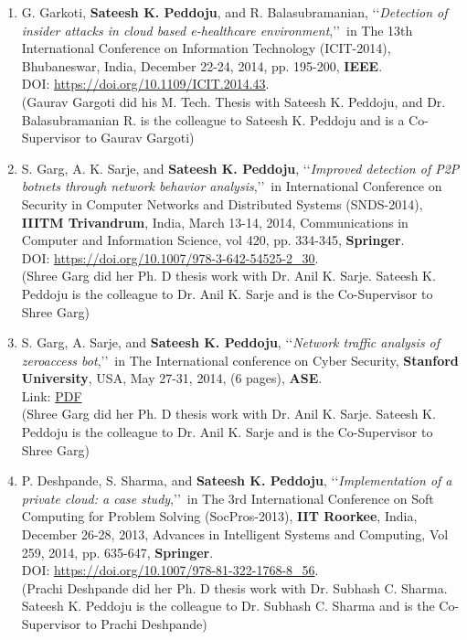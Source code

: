 \begin{enumerate}
	\item
	G. Garkoti, \textbf{Sateesh K. Peddoju}, and R. Balasubramanian, \lq\lq \textit{Detection of insider attacks in cloud based e-healthcare environment},\rq\rq\, in The 13th International Conference on Information Technology (ICIT-2014), Bhubaneswar, India, December 22-24, 2014, pp. 195-200,  \textbf{IEEE}. \\DOI: \url{https://doi.org/10.1109/ICIT.2014.43}. \\(Gaurav Gargoti did his M. Tech. Thesis with Sateesh K. Peddoju, and Dr. Balasubramanian R. is the colleague to Sateesh K. Peddoju and is a Co-Supervisor to Gaurav Gargoti)

	
	\item
	S. Garg, A. K. Sarje, and \textbf{Sateesh K. Peddoju}, \lq\lq \textit{Improved detection of P2P botnets through network behavior analysis},\rq\rq\, in International Conference on Security in Computer Networks and Distributed Systems (SNDS-2014), \textbf{IIITM Trivandrum}, India, March 13-14, 2014, Communications in Computer and Information Science, vol 420, pp. 334-345, \textbf{Springer}. \\DOI: \url{https://doi.org/10.1007/978-3-642-54525-2_30}. \\(Shree Garg did her Ph. D thesis work with Dr. Anil K. Sarje.  Sateesh K. Peddoju is the colleague to Dr. Anil K. Sarje and is the Co-Supervisor to Shree Garg)

	
	\item
	S. Garg, A. Sarje, and \textbf{Sateesh K. Peddoju}, \lq\lq \textit{Network traffic analysis of zeroaccess bot},\rq\rq\, in The International conference on Cyber Security, \textbf{Stanford University}, USA, May 27-31, 2014, (6 pages), \textbf{ASE}. \\Link: \href{https://pdfs.semanticscholar.org/32af/3ef10f049d7ca8e9d7240d2b0cbd94336e6c.pdf}{PDF} \\(Shree Garg did her Ph. D thesis work with Dr. Anil K. Sarje.  Sateesh K. Peddoju is the colleague to Dr. Anil K. Sarje and is the Co-Supervisor to Shree Garg)

	
	\item
	P. Deshpande, S. Sharma, and \textbf{Sateesh K. Peddoju}, \lq\lq \textit{Implementation of a private cloud: a case study},\rq\rq\, in The 3rd International Conference on Soft Computing for Problem Solving (SocPros-2013), \textbf{IIT Roorkee}, India, December 26-28, 2013, Advances in Intelligent Systems and Computing, Vol 259, 2014, pp. 635-647, \textbf{Springer}. \\DOI: \url{https://doi.org/10.1007/978-81-322-1768-8_56}. \\(Prachi Deshpande did her Ph. D thesis work with Dr. Subhash C. Sharma. Sateesh K. Peddoju is the colleague to Dr. Subhash C. Sharma and is the Co-Supervisor to Prachi Deshpande)


\end{enumerate}
